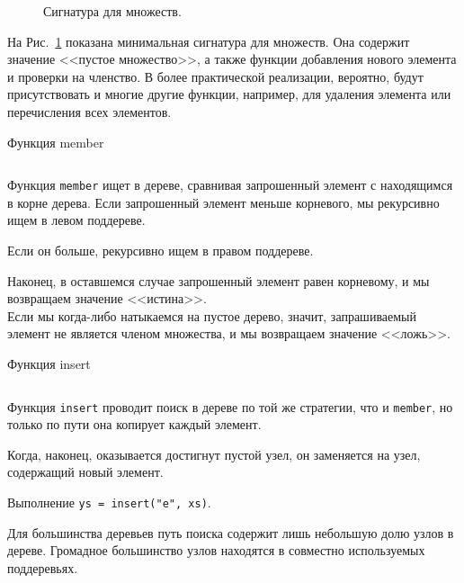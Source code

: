 \begin{frame}[fragile]{}
\begin{figure}[h]
  \centering
  \inputminted[firstline=12, lastline=16] {haskell}{code/SearchTree.hs}
  \caption{Сигнатура для множеств.}
\label{fig:2.7}
\end{figure}

На Рис.~\ref{fig:2.7} показана минимальная сигнатура для множеств. Она
содержит значение <<пустое множество>>, а также функции добавления
нового элемента и проверки на членство.  В более практической
реализации, вероятно, будут присутствовать и многие другие функции,
например, для удаления элемента или перечисления всех элементов.
\end{frame}

\begin{frame}[fragile]{Функция member}
  \inputminted[firstline=22, lastline=25] {haskell}{code/SearchTree.hs}

Функция \texttt{member} ищет в дереве, сравнивая запрошенный
элемент с находящимся в корне дерева. Если запрошенный элемент меньше
корневого, мы рекурсивно ищем в левом поддереве.

 Если он больше,
рекурсивно ищем в правом поддереве. 

Наконец, в оставшемся случае
запрошенный элемент равен корневому, и мы возвращаем значение
<<истина>>. \\

Если мы когда-либо натыкаемся на пустое дерево, значит,
запрашиваемый элемент не является членом множества, и мы возвращаем
значение <<ложь>>. 
\end{frame}

\begin{frame}[fragile]{Функция insert}
\inputminted[firstline=27, lastline=30] {haskell}{code/SearchTree.hs}

Функция \lstinline{insert} проводит поиск в дереве по той же стратегии,
что и \lstinline{member}, но только по пути она копирует каждый
элемент.

Когда, наконец, оказывается достигнут пустой узел, он
заменяется на узел, содержащий новый элемент.
 
\end{frame}

\begin{frame}[fragile]{}
\begin{minipage}{.48\textwidth}
		\par
\end{minipage}
\begin{minipage}{.48\textwidth}
	
\end{minipage}
Выполнение \texttt{ys = insert("e", xs)}. 

Для большинства деревьев путь
поиска содержит лишь небольшую долю узлов в дереве. Громадное
большинство узлов находятся в совместно используемых поддеревьях.
\end{frame}

